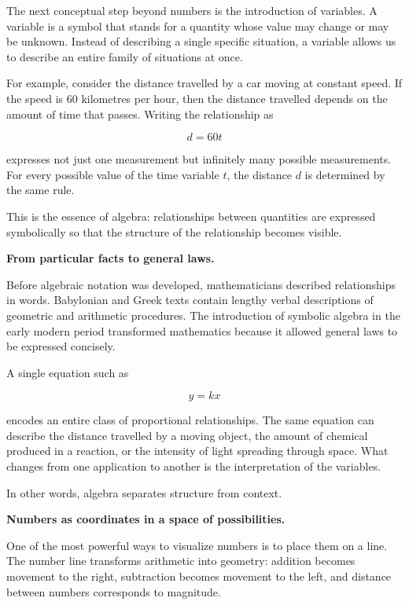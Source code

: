 \documentclass[11pt, openany]{book}
\theoremstyle{plain}
\theoremstyle{definition}
\theoremstyle{remark}
\begin{document}
The next conceptual step beyond numbers is the introduction of variables.
A variable is a symbol that stands for a quantity whose value may change
or may be unknown. Instead of describing a single specific situation, a
variable allows us to describe an entire family of situations at once.

For example, consider the distance travelled by a car moving at constant
speed. If the speed is 60 kilometres per hour, then the distance
travelled depends on the amount of time that passes. Writing the
relationship as

\[
d = 60t
\]

expresses not just one measurement but infinitely many possible
measurements. For every possible value of the time variable \(t\), the
distance \(d\) is determined by the same rule.

This is the essence of algebra: relationships between quantities are
expressed symbolically so that the structure of the relationship becomes
visible.

\medskip

\textbf{From particular facts to general laws.}

Before algebraic notation was developed, mathematicians described
relationships in words. Babylonian and Greek texts contain lengthy
verbal descriptions of geometric and arithmetic procedures. The
introduction of symbolic algebra in the early modern period transformed
mathematics because it allowed general laws to be expressed concisely.

A single equation such as

\[
y = kx
\]

encodes an entire class of proportional relationships. The same equation
can describe the distance travelled by a moving object, the amount of
chemical produced in a reaction, or the intensity of light spreading
through space. What changes from one application to another is the
interpretation of the variables.

In other words, algebra separates structure from context.

\medskip

\textbf{Numbers as coordinates in a space of possibilities.}

One of the most powerful ways to visualize numbers is to place them on a
line. The number line transforms arithmetic into geometry: addition
becomes movement to the right, subtraction becomes movement to the
left, and distance between numbers corresponds to magnitude.
\end{document}
